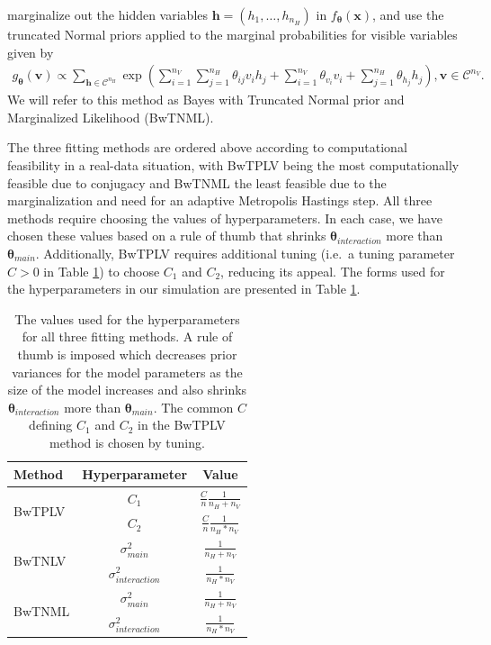 \documentclass[AMS,STIX1COL]{WileyNJD-v2}
\newcommand{\nv}{{n_{\scriptscriptstyle V}}}
\newcommand{\nh}{{n_{\scriptscriptstyle H}}}
\begin{document}
\begin{enumerate}
  marginalize out the hidden variables
  \(\boldsymbol h = (h_1, \dots, h_\nh)\) in
  \(f_{\boldsymbol \theta}(\boldsymbol x)\), and use the truncated
  Normal priors applied to the marginal probabilities for visible
  variables given by \begin{align*}
   g_{\boldsymbol \theta}(\boldsymbol v) \propto \sum\limits_{\boldsymbol h \in \mathcal{C}^\nh} \exp\left(\sum\limits_{i = 1}^\nv \sum\limits_{j=1}^\nh \theta_{ij} v_i h_j + \sum\limits_{i = 1}^\nv\theta_{v_i} v_i + \sum\limits_{j = 1}^\nh\theta_{h_j} h_j\right), \boldsymbol v \in \mathcal{C}^\nv.
   \end{align*} We will refer to this method as Bayes with Truncated
  Normal prior and Marginalized Likelihood (BwTNML).
\end{enumerate}

The three fitting methods are ordered above according to computational
feasibility in a real-data situation, with BwTPLV being the most
computationally feasible due to conjugacy and BwTNML the least feasible
due to the marginalization and need for an adaptive Metropolis Hastings
step. All three methods require choosing the values of hyperparameters.
In each case, we have chosen these values based on a rule of thumb that
shrinks \(\boldsymbol \theta_{interaction}\) more than
\(\boldsymbol \theta_{main}\). Additionally, BwTPLV requires additional
tuning (i.e.~a tuning parameter \(C > 0\) in Table \ref{tab:hyperparam})
to choose \(C_1\) and \(C_2\), reducing its appeal. The forms used for
the hyperparameters in our simulation are presented in Table
\ref{tab:hyperparam}.

\begin{table}[ht]
\centering
\begin{tabular}{|l|c|c|}
\hline 
Method & Hyperparameter & Value \\ 
\hline \hline
\multirow{2}{*}{BwTPLV} & $C_1$ & $\frac{C}{n}\frac{1}{\nh + \nv}$ \\
 & $C_2$ & $\frac{C}{n}\frac{1}{\nh*\nv}$ \\
\hline
\multirow{2}{*}{BwTNLV} & $\sigma^2_{main}$ & $\frac{1}{\nh + \nv}$ \\
 & $\sigma^2_{interaction}$ & $\frac{1}{\nh*\nv}$ \\
\hline
\multirow{2}{*}{BwTNML} & $\sigma^2_{main}$ & $\frac{1}{\nh + \nv}$ \\
 & $\sigma^2_{interaction}$ & $\frac{1}{\nh*\nv}$ \\
\hline
\end{tabular}
\caption{The values used for the hyperparameters for all three fitting methods. A rule of thumb is imposed which decreases prior variances for the model parameters as the size of the model increases and also shrinks $\boldsymbol \theta_{interaction}$ more than $\boldsymbol \theta_{main}$. The common $C$ defining $C_1$ and $C_2$  in the BwTPLV method is chosen by tuning.}
\label{tab:hyperparam}
\end{table}
\end{document}
